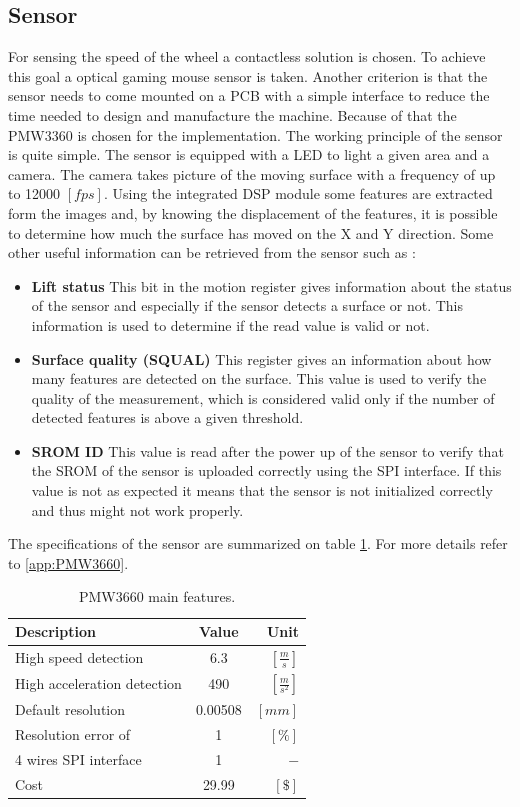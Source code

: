 \documentclass[12pt,a4paper, twoside]{article}
\begin{document}
\subsection{Sensor}
For sensing the speed of the wheel a contactless solution is chosen. To achieve this goal a optical gaming mouse sensor is taken. Another criterion is that the sensor needs to come mounted on a PCB with a simple interface to reduce the time needed to design and manufacture the machine.
Because of that the PMW3360 is chosen for the implementation.
The working principle of the sensor is quite simple. The sensor is equipped with a LED to light a given area and a camera. The camera takes picture of the moving surface with a frequency of up to 12000 $[fps]$. Using the integrated DSP module some features are extracted form the images and, by knowing the displacement of the features, it is possible to determine how much the surface has moved on the X and Y direction.
Some other useful information can be retrieved from the sensor such as :
\begin{itemize}
	\item \textbf{Lift status} This bit in the motion register gives information about the status of the sensor and especially if the sensor detects a surface or not. This information is used to determine if the read value is valid or not.
	\item \textbf{Surface quality (SQUAL)} This register gives an information about how many features are detected on the surface. This value is used to verify the quality of the measurement, which is considered valid only if the number of detected features is above a given threshold.
	\item \textbf{SROM ID} This value is read after the power up of the sensor to verify that the SROM of the sensor is uploaded correctly using the SPI interface. If this value is not as expected it means that the sensor is not initialized correctly and thus might not work properly. 
\end{itemize}
The specifications of the sensor are summarized on table \ref{tab:PMW3360}. For more details refer to \ref{app:PMW3660}.
\begin{table}[H]
	\centering
	\begin{tabular}{l||c|r} 
		\textbf{Description}&\textbf{Value}  &\textbf{Unit}  \\ 
		\hline
		\hline 
		High speed detection & 6.3 & $[\frac{m}{s}]$ \\ 
		\hline 
		High acceleration detection & 490  & $[\frac{m}{s^2}]$  \\ 
		\hline 
		Default resolution & 0.00508 & $[mm]$ \\ 
		\hline 
		Resolution error of & 1 & $[\%]$  \\ 
		\hline 
		4 wires SPI interface & 1 & $-$  \\ 
		\hline
		Cost & 29.99 &$[\$]$
	\end{tabular} 
	\caption{PMW3660 main features.}
	\label{tab:PMW3360}
\end{table}
\end{document}

